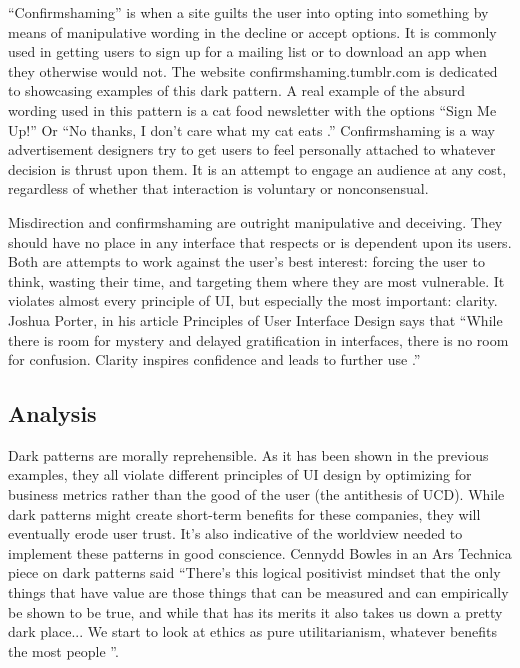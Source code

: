\documentclass[12pt, oneside]{article}
\begin{document}
``Confirmshaming'' is when a site guilts the user into opting into something by means of manipulative wording in the decline or accept options. It is commonly used in getting users to sign up for a mailing list or to download an app when they otherwise would not. The website confirmshaming.tumblr.com is dedicated to showcasing examples of this dark pattern. A real example of the absurd wording used in this pattern is a cat food newsletter with the options ``Sign Me Up!'' Or ``No thanks, I don't care what my cat eats \cite{confirmshaming}.'' Confirmshaming is a way advertisement designers try to get users to feel personally attached to whatever decision is thrust upon them. It is an attempt to engage an audience at any cost, regardless of whether that interaction is voluntary or nonconsensual.

Misdirection and confirmshaming are outright manipulative and deceiving. They should have no place in any interface that respects or is dependent upon its users. Both are attempts to work against the user's best interest: forcing the user to think, wasting their time, and targeting them where they are most vulnerable. It violates almost every principle of UI, but especially the most important: clarity. Joshua Porter, in his article Principles of User Interface Design says that ``While there is room for mystery and delayed gratification in interfaces, there is no room for confusion. Clarity inspires confidence and leads to further use \cite{porter}.''

\subsection{Analysis}

Dark patterns are morally reprehensible. As it has been shown in the previous examples, they all violate different principles of UI design by optimizing for business metrics rather than the good of the user (the antithesis of UCD). While dark patterns might create short-term benefits for these companies, they will eventually erode user trust. It's also indicative of the worldview needed to implement these patterns in good conscience. Cennydd Bowles in an Ars Technica piece on dark patterns said ``There’s this logical positivist mindset that the only things that have value are those things that can be measured and can empirically be shown to be true, and while that has its merits it also takes us down a pretty dark place... We start to look at ethics as pure utilitarianism, whatever benefits the most people \cite{grauer_2016}''.
\end{document}
